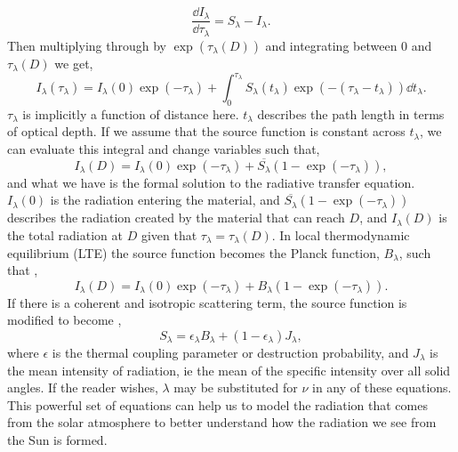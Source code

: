 \begin{equation}
    \frac{\dd I_\lambda}{\dd \tau_\lambda}=S_\lambda-I_\lambda.
\end{equation}
Then multiplying through by $\exp(\tau_\lambda(D))$ and integrating between 0 and $\tau_\lambda(D)$ we get,
\begin{equation}
    I_\lambda(\tau_\lambda)=I_\lambda(0)\exp(-\tau_\lambda)+\int_0^{\tau_\lambda}S_\lambda(t_\lambda)\exp(-(\tau_\lambda-t_\lambda))\dd t_\lambda.
\end{equation}
$\tau_\lambda$ is implicitly a function of distance here. $t_\lambda$ describes the path length in terms of optical depth. If we assume that the source function is constant across $t_\lambda$, we can evaluate this integral and change variables such that,
\begin{equation}
    I_\lambda(D)=I_\lambda(0)\exp(-\tau_\lambda)+
    \overline{S_\lambda}\left(1-\exp\left(-\tau_\lambda\right)\right),
    \label{eq:line}
\end{equation}
and what we have is the formal solution to the radiative transfer equation. $I_\lambda(0)$ is the radiation entering the material, and $\overline{S_\lambda}\left(1-\exp\left(-\tau_\lambda\right)\right)$ describes the radiation created by the material that can reach $D$, and $I_\lambda(D)$ is the total radiation at $D$ given that $\tau_\lambda=\tau_\lambda(D)$. In local thermodynamic equilibrium (LTE) the source function becomes the Planck function, $B_\lambda$, such that \citep{rutten_introduction_1993,hubeny_theory_2015},
\begin{equation}
    I_\lambda(D)=I_\lambda(0)\exp(-\tau_\lambda)+
    B_\lambda\left(1-\exp\left(-\tau_\lambda\right)\right).
\end{equation}
If there is a coherent and isotropic scattering term, the source function is modified to become \citep{hubeny_theory_2015}, 
\begin{equation}
    S_\lambda=\epsilon_\lambda B_\lambda+(1-\epsilon_\lambda)J_\lambda,
\end{equation}
where $\epsilon$ is the thermal coupling parameter or destruction probability, and $J_\lambda$ is the mean intensity of radiation, ie the mean of the specific intensity over all solid angles. If the reader wishes, $\lambda$ may be substituted for $\nu$ in any of these equations.
This powerful set of equations can help us to model the radiation that comes from the solar atmosphere to better understand how the radiation we see from the Sun is formed.

